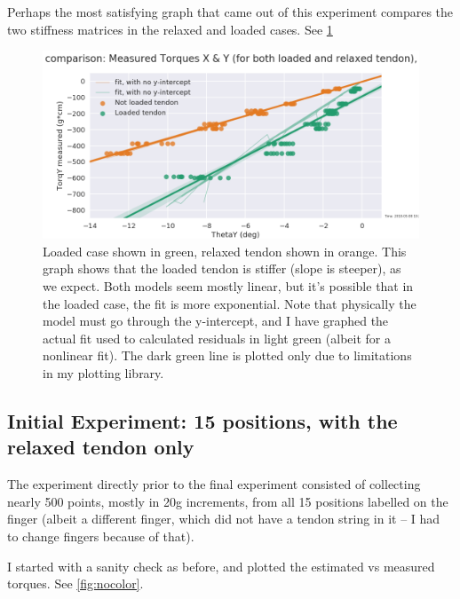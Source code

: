 \documentclass[preprint,12pt,3p]{elsarticle}
\begin{document}
Perhaps the most satisfying graph that came out of this experiment compares the two stiffness
matrices in the relaxed and loaded cases. See  \cref{fig:comparison}

\begin{figure}[H]
\centering
\includegraphics[width=.9\textwidth]{images/stiff/StiffnessComparison.png}
\caption{Loaded case shown in green, relaxed tendon shown in orange. This graph shows that the
loaded tendon is stiffer (slope is steeper), as we expect. Both models seem mostly linear, but it's
possible that in the loaded case, the fit is more exponential. Note that physically the model must
go through the y-intercept, and I have graphed the actual fit used to calculated residuals in light
green (albeit for a nonlinear fit). The dark green line is plotted only due to limitations in my plotting
library.}
\label{fig:comparison}
\end{figure}

\subsection{Initial Experiment: 15 positions, with the relaxed tendon only}
\label{init-data}

The experiment directly prior to the final experiment consisted of collecting nearly 500 points,
mostly in 20g increments, from all 15 positions labelled on the finger (albeit a different finger,
which did not have a tendon string in it -- I had to change fingers because of that).

I started with a sanity check as before, and plotted the estimated vs measured torques. See
\cref{fig:nocolor}.
\end{document}
